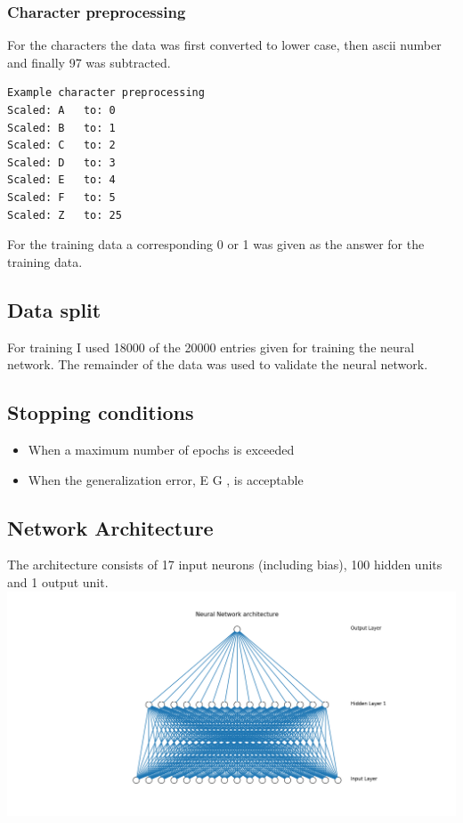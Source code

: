 \documentclass[11pt]{article}
\makeatletter
\def\maxwidth{\ifdim\Gin@nat@width>\linewidth\linewidth
    \else\Gin@nat@width\fi}
\let\Oldincludegraphics\includegraphics
\renewcommand{\includegraphics}[1]{\Oldincludegraphics[width=.8\maxwidth]{#1}}
\providecommand{\tightlist}{%
      \setlength{\itemsep}{0pt}\setlength{\parskip}{0pt}}
\makeatother
\begin{document}
\hypertarget{character-preprocessing}{%
\subsubsection{Character preprocessing}\label{character-preprocessing}}

For the characters the data was first converted to lower case, then
ascii number and finally 97 was subtracted.

\begin{verbatim}
Example character preprocessing
Scaled: A   to: 0
Scaled: B   to: 1
Scaled: C   to: 2
Scaled: D   to: 3
Scaled: E   to: 4
Scaled: F   to: 5
Scaled: Z   to: 25
\end{verbatim}

For the training data a corresponding 0 or 1 was given as the answer for
the training data.

\hypertarget{data-split}{%
\subsection{Data split}\label{data-split}}

For training I used 18000 of the 20000 entries given for training the
neural network. The remainder of the data was used to validate the
neural network.

\hypertarget{stopping-conditions}{%
\subsection{Stopping conditions}\label{stopping-conditions}}

\begin{itemize}
\tightlist
\item
  When a maximum number of epochs is exceeded
\item
  When the generalization error, E G , is acceptable
\end{itemize}

\hypertarget{network-architecture}{%
\subsection{Network Architecture}\label{network-architecture}}

The architecture consists of 17 input neurons (including bias), 100
hidden units and 1 output unit. \includegraphics{Experiment2NN.png}
\end{document}
